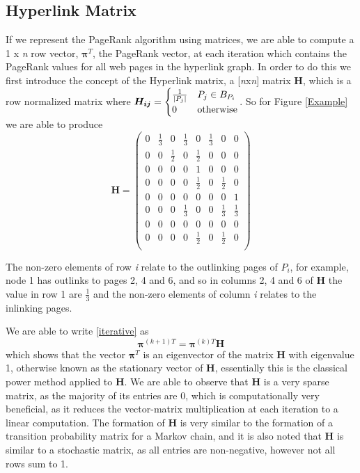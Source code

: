 \documentclass[11pt]{report}
\begin{document}
\subsection{Hyperlink Matrix} \label{sec:hyperlink}
If we represent the PageRank algorithm using matrices, we are able to compute a 1 x \textit{n} row vector, $\boldsymbol{\pi}^T$, the PageRank vector, at each iteration which contains the PageRank values for all web pages in the hyperlink graph. In order to do this we first introduce the concept of the Hyperlink matrix, a [\textit{n}x\textit{n}] matrix \textbf{H}, which is a row normalized matrix where 
\(\boldsymbol{H_{ij}} = \begin{cases} \frac{1}{\vert P_j \vert} & P_j\in B_{P_i } \\ 0 & \textnormal{otherwise} \end{cases}\). So for Figure \ref{Example} we are able to produce 
\[\textbf{H}=\left(
\begin{array}{cccccccc}
0 & \frac{1}{3} & 0 & \frac{1}{3} & 0 &\frac{1}{3} & 0& 0 \\
0 & 0 &\frac{1}{2}& 0 &\frac{1}{2}& 0 & 0 & 0\\
0 & 0 & 0 & 0 & 1 & 0 & 0 & 0\\
0 & 0 & 0 & 0 & \frac{1}{2} & 0 & \frac{1}{2} & 0\\
0 & 0 & 0 & 0 & 0 & 0 & 0 & 1\\
0 & 0 & 0 & \frac{1}{3} & 0 & 0 & \frac{1}{3} & \frac{1}{3} \\
0 & 0 & 0 & 0 & 0 & 0 & 0 & 0\\
0 & 0 & 0 & 0 & \frac{1}{2} & 0 & \frac{1}{2} & 0\\
\end{array}
\right)	\]

The non-zero elements of row \textit{i} relate to the outlinking pages of $P_i$, for example, node 1 has outlinks to pages 2, 4 and 6, and so in columns 2, 4 and 6 of \textbf{H} the value in row 1 are $\frac{1}{3}$ and the non-zero elements of column \textit{i} relates to the inlinking pages.

We are able to write \eqref{iterative} as \begin{equation} \label{power H}
\boldsymbol\pi^{(k+1)T} = \boldsymbol\pi^{(k)T}\textbf{H}
\end{equation}  which shows that the vector $\boldsymbol\pi^T$ is an eigenvector of the matrix \textbf{H} with eigenvalue 1, otherwise known as the stationary vector of \textbf{H}, essentially this is the classical power method applied to \textbf{H}. We are able to observe that \textbf{H} is a very sparse matrix, as the majority of its entries are 0, which is computationally very beneficial, as it reduces the vector-matrix multiplication at each iteration to a linear computation. The formation of \textbf{H} is very similar to the formation of a transition probability matrix for a Markov chain, and it is also noted that \textbf{H} is similar to a stochastic matrix, as all entries are non-negative, however not all rows sum to 1.
\end{document}
